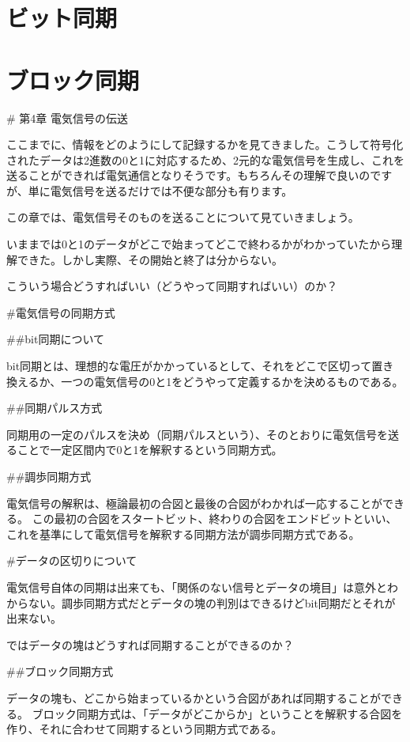 \section{ビット同期}
\section{ブロック同期}



# 第4章 電気信号の伝送

ここまでに、情報をどのようにして記録するかを見てきました。こうして符号化されたデータは2進数の0と1に対応するため、2元的な電気信号を生成し、これを送ることができれば電気通信となりそうです。もちろんその理解で良いのですが、単に電気信号を送るだけでは不便な部分も有ります。

この章では、電気信号そのものを送ることについて見ていきましょう。

いままでは0と1のデータがどこで始まってどこで終わるかがわかっていたから理解できた。しかし実際、その開始と終了は分からない。

こういう場合どうすればいい（どうやって同期すればいい）のか？

#電気信号の同期方式

##bit同期について

bit同期とは、理想的な電圧がかかっているとして、それをどこで区切って置き換えるか、一つの電気信号の0と1をどうやって定義するかを決めるものである。

##同期パルス方式

同期用の一定のパルスを決め（同期パルスという）、そのとおりに電気信号を送ることで一定区間内で0と1を解釈するという同期方式。

##調歩同期方式

電気信号の解釈は、極論最初の合図と最後の合図がわかれば一応することができる。
この最初の合図をスタートビット、終わりの合図をエンドビットといい、これを基準にして電気信号を解釈する同期方法が調歩同期方式である。

#データの区切りについて

電気信号自体の同期は出来ても、「関係のない信号とデータの境目」は意外とわからない。調歩同期方式だとデータの塊の判別はできるけどbit同期だとそれが出来ない。

ではデータの塊はどうすれば同期することができるのか？

##ブロック同期方式

データの塊も、どこから始まっているかという合図があれば同期することができる。
ブロック同期方式は、「データがどこからか」ということを解釈する合図を作り、それに合わせて同期するという同期方式である。

